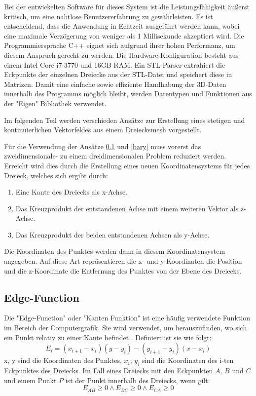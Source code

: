 \documentclass[conference]{IEEEtran}
\begin{document}
Bei der entwickelten Software für dieses System ist die Leistungsfähigkeit äußerst kritisch, um eine nahtlose Benutzererfahrung zu gewährleisten. Es ist entscheidend, dass die Anwendung in Echtzeit ausgeführt werden kann, wobei eine maximale Verzögerung von weniger als 1 Millisekunde akzeptiert wird. Die Programmiersprache C++ eignet sich aufgrund ihrer hohen Performanz, um diesem Anspruch gerecht zu werden. Die Hardware-Konfiguration besteht aus einem Intel Core i7-3770 und 16GB RAM. Ein STL-Parser extrahiert die Eckpunkte der einzelnen Dreiecke aus der STL-Datei und speichert diese in Matrizen. Damit eine einfache sowie effiziente Handhabung der 3D-Daten innerhalb des Programms möglich bleibt, werden Datentypen und Funktionen aus der "Eigen" Bibliothek verwendet. 

Im folgenden Teil werden verschieden Ansätze zur Erstellung eines stetigen und kontinuierlichen Vektorfeldes aus einem Dreiecksmesh vorgestellt. 

Für die Verwendung der Ansätze \ref*{edge} und \ref*{bary} muss vorerst das zweidimensionale- zu einem dreidimensionalen Problem reduziert werden. Erreicht wird dies durch die Erstellung eines neuen Koordinatensystems für jedes Dreieck, welches sich ergibt durch:
\begin{enumerate}
    \item Eine Kante des Dreiecks als x-Achse.
    \item Das Kreuzprodukt der entstandenen Achse mit einem weiteren Vektor als z-Achse.
    \item Das Kreuzprodukt der beiden entstandenen Achsen als y-Achse.
\end{enumerate}
Die Koordinaten des Punktes werden dann in diesem Koordinatensystem angegeben. Auf diese Art repräsentieren die x- und y-Koordinaten die Position und die z-Koordinate die Entfernung des Punktes von der Ebene des Dreiecks. 

\subsection{Edge-Function}\label{edge}
Die "Edge-Function" oder "Kanten Funktion" ist eine häufig verwendete Funktion im Bereich der Computergrafik. Sie wird verwendet, um herauszufinden, wo sich ein Punkt relativ zu einer Kante befindet \autocite{pinedaParallelAlgorithmPolygon1988}. Definiert ist sie wie folgt:
\begin{equation}
    E_{i} = (x_{i+1} - x_{i})(y - y_{i}) - (y_{i+1} - y_{i})(x - x_{i})
\end{equation}
x, y sind die Koordinaten des Punktes, $x_{i}$, $y_{i}$ sind die Koordinaten des i-ten Eckpunktes des Dreiecks. Im Fall eines Dreiecks mit den Eckpunkten $A$, $B$ und $C$ und einem Punkt $P$ ist der Punkt innerhalb des Dreiecks, wenn gilt:
\begin{equation}
    E_{AB} \geq 0 \land E_{BC} \geq 0 \land E_{CA} \geq 0
\end{equation}
\end{document}
